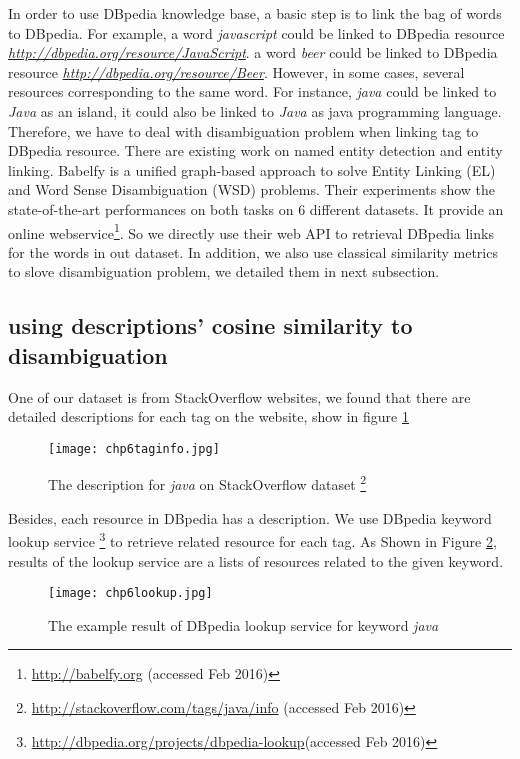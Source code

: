 In order to use DBpedia knowledge base, a basic step is to link the bag of words to DBpedia. For example, a word \textit{javascript} could be linked to DBpedia resource \textit{\url{http://dbpedia.org/resource/JavaScript}}. a word \textit{beer} could be linked to DBpedia resource	\textit{\url{http://dbpedia.org/resource/Beer}}. However, in some cases, several resources corresponding to the same word. For instance, \textit{java} could be linked to \textit{Java} as an island, it could also be linked to \textit{Java} as java programming language. Therefore, we have to deal with disambiguation problem when linking tag to DBpedia resource. There are existing work on named entity detection and entity linking.  Babelfy\cite{chp6babelfy:Moroetal:14tacl} is a unified graph-based approach to solve Entity Linking (EL) and Word Sense Disambiguation (WSD) problems. Their experiments show the state-of-the-art performances on both tasks on 6 different datasets. It provide an online webservice\footnote{\url{http://babelfy.org} (accessed Feb 2016)}. So we directly use their web API to retrieval DBpedia links for the words in out dataset. In addition, we also use classical similarity metrics to slove disambiguation problem, we detailed them in next subsection.

\subsection{using descriptions' cosine similarity to disambiguation}
One of our dataset is from StackOverflow websites, we found that there are detailed descriptions for each tag on the website, show in figure \ref{fig:chp6taginfo}
\begin{figure}[htp]
\centering
\texttt{[image: chp6taginfo.jpg]}  
\caption{The description for \textit{java} on StackOverflow dataset \footnote{\url{http://stackoverflow.com/tags/java/info} (accessed Feb 2016)}}
\label{fig:chp6taginfo} 
\end{figure}

Besides, each resource in DBpedia has a description.  We use DBpedia keyword lookup service \footnote{\url{http://dbpedia.org/projects/dbpedia-lookup}(accessed Feb 2016)} to retrieve related resource for each tag. As Shown in Figure \ref{fig:chp6lookup}, results of the lookup service are a lists of resources related to the given keyword.

\begin{figure}[htp]
\centering
\texttt{[image: chp6lookup.jpg]}  
\caption{The example result of DBpedia lookup service for keyword \textit{java}}
\label{fig:chp6lookup} 
\end{figure}

